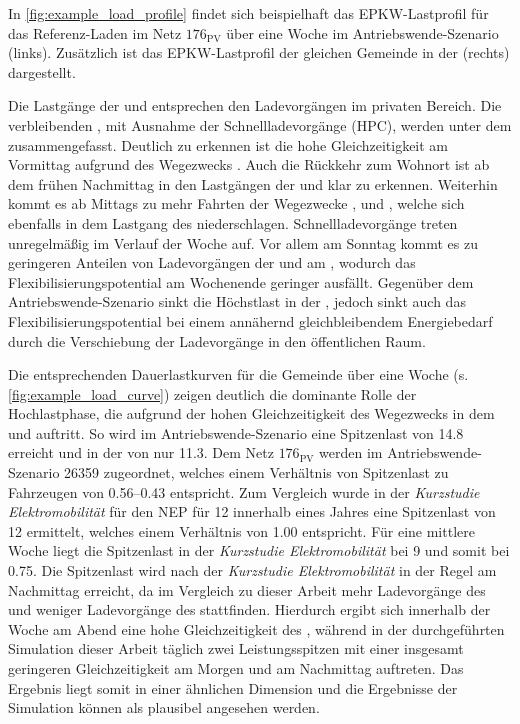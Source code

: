 

In \autoref{fig:example_load_profile} findet sich beispielhaft das \gls{EPKW}-Lastprofil für das Referenz-Laden im Netz \(176_{\text{PV}}\) über eine Woche im Antriebswende-Szenario (links).
Zusätzlich ist das \gls{EPKW}-Lastprofil der gleichen Gemeinde in der \SzeFirmenparkplatz (rechts) dargestellt.



Die Lastgänge der \UCs \zH und \Firmeparkplatz entsprechen den Ladevorgängen im privaten Bereich.
Die verbleibenden \UCsdot, mit Ausnahme der Schnellladevorgänge (\gls{HPC}), werden unter dem \UC \oeffen zusammengefasst.
Deutlich zu erkennen ist die hohe Gleichzeitigkeit am Vormittag aufgrund des Wegezwecks \Arbeitdot.
Auch die Rückkehr zum Wohnort ist ab dem frühen Nachmittag in den Lastgängen der \UCs \zH und \oeffen klar zu erkennen.
Weiterhin kommt es ab Mittags zu mehr Fahrten der Wegezwecke \Einkaufdot, \Erledigung und \Freizeitdot, welche sich ebenfalls in dem Lastgang des \UC \oeffen niederschlagen.
Schnellladevorgänge treten unregelmäßig im Verlauf der Woche auf.
Vor allem am Sonntag kommt es zu geringeren Anteilen von Ladevorgängen der \UCs \zH und am \Firmeparkplatzdot, wodurch das Flexibilisierungspotential am Wochenende geringer ausfällt.
Gegenüber dem Antriebswende-Szenario sinkt die Höchstlast in der \SzeFirmenparkplatzdot, jedoch sinkt auch das Flexibilisierungspotential bei einem annähernd gleichbleibendem Energiebedarf durch die Verschiebung der Ladevorgänge in den öffentlichen Raum.\medskip

Die entsprechenden Dauerlastkurven für die Gemeinde über eine Woche (s. \autoref{fig:example_load_curve}) zeigen deutlich die dominante Rolle der Hochlastphase, die aufgrund der hohen Gleichzeitigkeit des Wegezwecks \Arbeit in dem \UCs \Firmeparkplatz und \Straszenrand auftritt.
So wird im Antriebswende-Szenario eine Spitzenlast von \SI{14.8}{\mw} erreicht und in der \SzeFirmenparkplatz von nur \SI{11.3}{\mw}.
Dem Netz \(176_{\text{PV}}\) werden im Antriebswende-Szenario \SI{26359}{\FZ} zugeordnet, welches einem Verhältnis von Spitzenlast zu Fahrzeugen von \SIrange[range-phrase=~bzw.~]{0.56}{0.43}{\kWperFZ} entspricht.
Zum Vergleich wurde in der \textit{Kurzstudie Elektromobilität} für den \gls{NEP} \cite{Ebner2019} für \SI{12}{\MioStk} innerhalb eines Jahres eine Spitzenlast von \SI{12}{\gw} ermittelt, welches einem Verhältnis von \SI{1.00}{\kWperFZ} entspricht.
Für eine mittlere Woche liegt die Spitzenlast in der \textit{Kurzstudie Elektromobilität} bei \SI{9}{\gw} und somit bei \SI{0.75}{\kWperFZ}.
Die Spitzenlast wird nach der \textit{Kurzstudie Elektromobilität} in der Regel am Nachmittag erreicht, da im Vergleich zu dieser Arbeit mehr Ladevorgänge des \UC \zH und weniger Ladevorgänge des \UC \Firmeparkplatz stattfinden.
Hierdurch ergibt sich innerhalb der Woche am Abend eine hohe Gleichzeitigkeit des \UC \zHdot, während in der durchgeführten Simulation dieser Arbeit täglich zwei Leistungsspitzen mit einer insgesamt geringeren Gleichzeitigkeit am Morgen und am Nachmittag auftreten.
Das Ergebnis liegt somit in einer ähnlichen Dimension und die Ergebnisse der Simulation können als plausibel angesehen werden.

